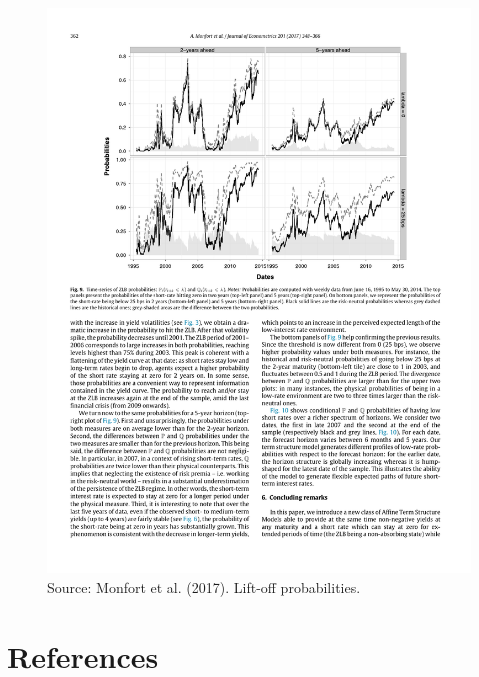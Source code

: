 \documentclass[
  12pt,
]{book}
\theoremstyle{definition}
\theoremstyle{definition}
\theoremstyle{definition}
\theoremstyle{definition}
\theoremstyle{remark}
\begin{document}
\begin{figure}

{\centering \includegraphics[width=0.95\linewidth]{figures/Figure_LiftOff} 

}

\caption{Source: Monfort et al. (2017). Lift-off probabilities.}\label{fig:liftOff}
\end{figure}

\hypertarget{references}{%
\chapter{References}\label{references}}

  
\end{document}
